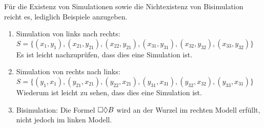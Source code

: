 Für die Existenz von Simulationen sowie die Nichtexistenz von Bisimulation reicht es,
lediglich Beispiele anzugeben.

\begin{enumerate}
	\item Simulation von links nach rechts: $S = \{ (x_1,y_1), (x_{21}, y_{21}), (x_{22}, y_{21}), (x_{31}, y_{31}), (x_{32},  y_{32}), (x_{33}, y_{32}) \}$
		Es ist leicht nachzuprüfen, dass dies eine Simulation ist.
	\item Simulation von rechts nach links: $S = \{ (y_1,x_1), (y_{21}, x_{21}), (y_{22}, x_{21}), (y_{31}, x_{31}), (y_{32},  x_{32}), (y_{33}, x_{31}) \}$
		Wiederum ist leicht zu sehen, dass dies eine Simulation ist.
	\item Bisimulation: Die Formel $\Box \Diamond B$ wird an der Wurzel im rechten Modell erfüllt, nicht jedoch im linken Modell.
\end{enumerate}









